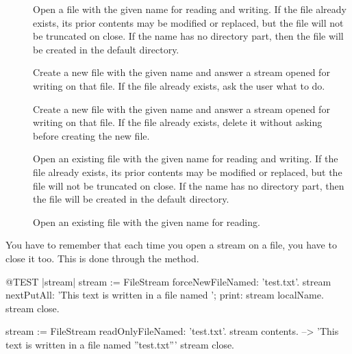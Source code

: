 \documentclass[a4paper,10pt,twoside]{book}
\begin{document}
\begin{description}

\item[]
  Open a file with the given name for reading and writing.
  If the file already exists, its prior contents may be modified or replaced, but the file will not be truncated on close.
  If the name has no directory part, then the file will be created in the default directory.
	
\item[]
  Create a new file with the given name and answer a stream opened for writing on that file.
  If the file already exists, ask the user what to do.
	
\item[]
  Create a new file with the given name and answer a stream opened for writing on that file.
  If the file already exists, delete it without asking before creating the new file.

\item[]
  Open an existing file with the given name for reading and writing.
  If the file already exists, its prior contents may be modified or replaced, but the file will not be truncated on close.
  If the name has no directory part, then the file will be created in the default directory.

\item[] Open an existing file with the
	given name for reading.

\end{description}

You have to remember that each time you open a stream on a file, you have to close it too.
This is done through the  method.

\begin{code}{@TEST |stream|}
stream := FileStream forceNewFileNamed: 'test.txt'.
stream
    nextPutAll: 'This text is written in a file named ';
    print: stream localName.
stream close.

stream := FileStream readOnlyFileNamed: 'test.txt'.
stream contents. --> 'This text is written in a file named ''test.txt'''
stream close.
\end{code}
\end{document}
